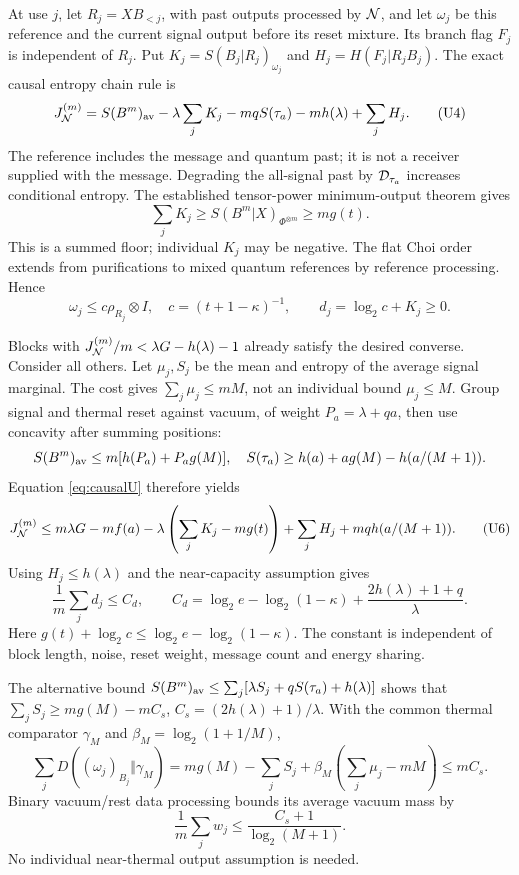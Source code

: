 \documentclass[11pt]{article}
\begin{document}
At use \(j\), let \(R_j=XB_{<j}\), with past outputs processed by
\({\cal N}\), and let \(\omega_j\) be this reference and the current
signal output before its reset mixture. Its branch flag \(F_j\) is
independent of \(R_j\). Put \(K_j=S(B_j|R_j)_{\omega_j}\) and
\(H_j=H(F_j|R_jB_j)\). The exact causal entropy chain rule is
\begin{equation}
 J_{\cal N}^{(m)}=S(B^m)_{\rm av}
       -\lambda\sum_jK_j-mqS(\tau_a)-mh(\lambda)+\sum_jH_j .
 \tag{U4}\label{eq:causalU}
\end{equation}
The reference includes the message and quantum past; it is not a
receiver supplied with the message. Degrading the all-signal past by
\({\cal D}_{\tau_a}\) increases conditional entropy. The established
tensor-power minimum-output theorem
\cite[Eq.(2)]{gaussiancl}\cite[Proposition4, Sections6--7]{optimizer} gives
\begin{equation}
 \sum_jK_j\ge S(B^m|X)_{\Phi^{\otimes m}}\ge m g(t).
 \tag{U5}\label{eq:summedU}
\end{equation}
This is a summed floor; individual \(K_j\) may be negative.
The flat Choi order extends from purifications to mixed quantum
references by reference processing. Hence
\[
 \omega_j\le c\rho_{R_j}\otimes I,\quad
 c=(t+1-\kappa)^{-1},\qquad d_j=\log_2c+K_j\ge0.
\]

Blocks with \(J_{\cal N}^{(m)}/m<\lambda G-h(\lambda)-1\) already
satisfy the desired converse. Consider all others.
Let \(\mu_j,S_j\) be the mean and entropy of the average signal marginal.
The cost gives \(\sum_j\mu_j\le mM\), not an individual bound
\(\mu_j\le M\). Group signal and thermal reset against vacuum, of weight
\(P_a=\lambda+qa\), then use concavity after summing positions:
\[
 S(B^m)_{\rm av}\le m[h(P_a)+P_ag(M)],\quad
 S(\tau_a)\ge h(a)+ag(M)-h(a/(M+1)).
\]
Equation \eqref{eq:causalU} therefore yields
\begin{equation}
 J_{\cal N}^{(m)}
 \le m\lambda G-mf(a)-\lambda\left(\sum_jK_j-mg(t)\right)
              +\sum_jH_j+mqh(a/(M+1)).          \tag{U6}\label{eq:blockboundU}
\end{equation}
Using \(H_j\le h(\lambda)\) and the near-capacity assumption gives
\[
 \frac1m\sum_jd_j\le C_d,\qquad
 C_d=\log_2e-\log_2(1-\kappa)
                  +\frac{2h(\lambda)+1+q}{\lambda}.
\]
Here \(g(t)+\log_2c\le\log_2e-\log_2(1-\kappa)\).
The constant is independent of block length, noise, reset weight,
message count and energy sharing.

The alternative bound
\(S(B^m)_{\rm av}\le\sum_j[\lambda S_j+qS(\tau_a)+h(\lambda)]\)
shows that \(\sum_jS_j\ge mg(M)-mC_s\),
\(C_s=(2h(\lambda)+1)/\lambda\).
With the common thermal comparator \(\gamma_M\) and
\(\beta_M=\log_2(1+1/M)\),
\[
 \sum_jD((\omega_j)_{B_j}\Vert\gamma_M)
 =mg(M)-\sum_jS_j+\beta_M\left(\sum_j\mu_j-mM\right)\le mC_s.
\]
Binary vacuum/rest data processing bounds its average vacuum mass by
\[
 \frac1m\sum_j w_j\le\frac{C_s+1}{\log_2(M+1)}.
\]
No individual near-thermal output assumption is needed.
\end{document}
